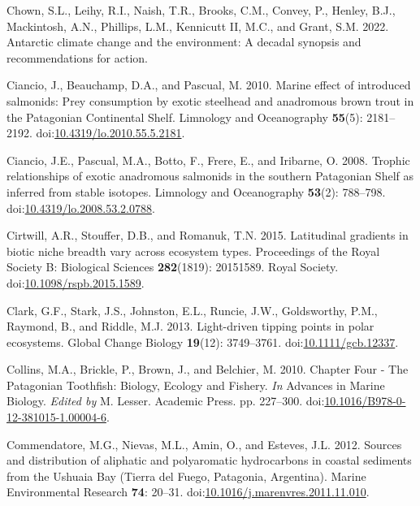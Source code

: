 \documentclass[
]{article}
\newlength{\cslhangindent}
\newenvironment{CSLReferences}[2] %
 {\begin{list}{}{%
  \setlength{\itemindent}{0pt}
  \setlength{\leftmargin}{0pt}
  \setlength{\parsep}{0pt}
  \ifodd #1
   \setlength{\leftmargin}{\cslhangindent}
   \setlength{\itemindent}{-1\cslhangindent}
  \fi
  \setlength{\itemsep}{#2\baselineskip}}}
 {\end{list}}
\begin{document}
\begin{CSLReferences}{1}{0}
Chown, S.L., Leihy, R.I., Naish, T.R., Brooks, C.M., Convey, P., Henley,
B.J., Mackintosh, A.N., Phillips, L.M., Kennicutt II, M.C., and Grant,
S.M. 2022. Antarctic climate change and the environment: A decadal
synopsis and recommendations for action.

Ciancio, J., Beauchamp, D.A., and Pascual, M. 2010. Marine effect of
introduced salmonids: {Prey} consumption by exotic steelhead and
anadromous brown trout in the {Patagonian Continental Shelf}. Limnology
and Oceanography \textbf{55}(5): 2181--2192.
doi:\href{https://doi.org/10.4319/lo.2010.55.5.2181}{10.4319/lo.2010.55.5.2181}.

Ciancio, J.E., Pascual, M.A., Botto, F., Frere, E., and Iribarne, O.
2008. Trophic relationships of exotic anadromous salmonids in the
southern {Patagonian Shelf} as inferred from stable isotopes. Limnology
and Oceanography \textbf{53}(2): 788--798.
doi:\href{https://doi.org/10.4319/lo.2008.53.2.0788}{10.4319/lo.2008.53.2.0788}.

Cirtwill, A.R., Stouffer, D.B., and Romanuk, T.N. 2015. Latitudinal
gradients in biotic niche breadth vary across ecosystem types.
Proceedings of the Royal Society B: Biological Sciences
\textbf{282}(1819): 20151589. Royal Society.
doi:\href{https://doi.org/10.1098/rspb.2015.1589}{10.1098/rspb.2015.1589}.

Clark, G.F., Stark, J.S., Johnston, E.L., Runcie, J.W., Goldsworthy,
P.M., Raymond, B., and Riddle, M.J. 2013. Light-driven tipping points in
polar ecosystems. Global Change Biology \textbf{19}(12): 3749--3761.
doi:\href{https://doi.org/10.1111/gcb.12337}{10.1111/gcb.12337}.

Collins, M.A., Brickle, P., Brown, J., and Belchier, M. 2010. Chapter
{Four} - {The Patagonian Toothfish}: {Biology}, {Ecology} and {Fishery}.
\emph{In} Advances in {Marine Biology}. \emph{Edited by} M. Lesser.
Academic Press. pp. 227--300.
doi:\href{https://doi.org/10.1016/B978-0-12-381015-1.00004-6}{10.1016/B978-0-12-381015-1.00004-6}.

Commendatore, M.G., Nievas, M.L., Amin, O., and Esteves, J.L. 2012.
Sources and distribution of aliphatic and polyaromatic hydrocarbons in
coastal sediments from the {Ushuaia Bay} ({Tierra} del {Fuego},
{Patagonia}, {Argentina}). Marine Environmental Research \textbf{74}:
20--31.
doi:\href{https://doi.org/10.1016/j.marenvres.2011.11.010}{10.1016/j.marenvres.2011.11.010}.


\end{CSLReferences}
\end{document}
